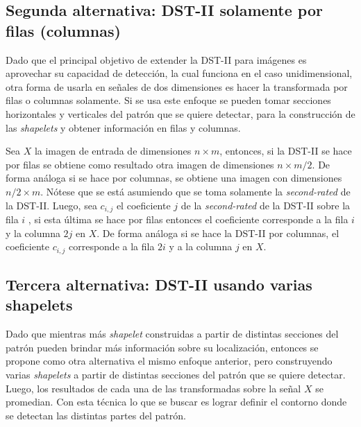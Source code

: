 \subsection{Segunda alternativa: DST-II solamente por filas (columnas)}

Dado que el principal objetivo de extender la DST-II para imágenes es aprovechar su capacidad de detección, la cual funciona 
en el caso unidimensional, otra forma de usarla en señales de dos dimensiones es hacer la transformada
por filas o columnas solamente.
Si se usa este enfoque se pueden tomar secciones horizontales y verticales del patrón que se quiere detectar, para 
la construcción de las \textit{shapelets} y obtener información en filas y columnas.

Sea $X$ la imagen de entrada de dimensiones $n\times m$, entonces, si la DST-II se hace por filas se obtiene
como resultado otra imagen de dimensiones $n \times m/2$. De forma análoga si se hace por columnas, se obtiene
una imagen con dimensiones $n/2 \times m$. Nótese que se está asumiendo que se toma solamente la 
\textit{second-rated} de la DST-II. Luego, sea $c_{i,j}$ el coeficiente $j$ de la \textit{second-rated} 
de la DST-II sobre la fila $i$ , si esta última se hace por filas
entonces el coeficiente corresponde a la fila $i$ y la columna $2j$ en $X$. De forma análoga si se hace
la DST-II por columnas, el coeficiente $c_{i,j}$ corresponde a la fila $2i$ y a la columna $j$ en $X$.

\subsection{Tercera alternativa: DST-II usando varias shapelets}

Dado que mientras más \textit{shapelet} construidas a partir de distintas secciones del patrón pueden brindar más información
sobre su localización, entonces se propone como otra alternativa el mismo enfoque anterior, pero construyendo
varias \textit{shapelets} a partir de distintas secciones del patrón que se quiere detectar. Luego, los resultados
de cada una de las transformadas sobre la señal $X$ se promedian. Con esta técnica lo que se buscar es lograr definir
el contorno donde se detectan las distintas partes del patrón.


